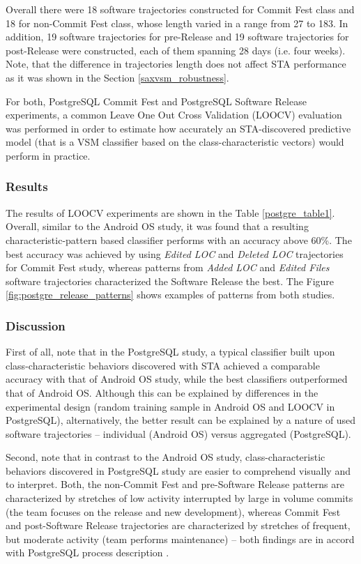 Overall there were 18 software trajectories constructed for Commit Fest class and 18 for non-Commit Fest class, whose length varied in a range from 27 to 183. In addition, 19 software trajectories for pre-Release and 19 software trajectories for post-Release were constructed, each of them spanning 28 days (i.e. four weeks). Note, that the difference in trajectories length does not affect STA performance as it was shown in the Section \ref{saxvsm_robustness}.

For both, PostgreSQL Commit Fest and PostgreSQL Software Release experiments, a common Leave One Out Cross Validation (LOOCV) \cite{citeulike:11275990} evaluation was performed in order to estimate how accurately an STA-discovered predictive model (that is a VSM classifier based on the class-characteristic vectors) would perform in practice.

\subsubsection{Results}
The results of LOOCV experiments are shown in the Table \ref{postgre_table1}. Overall, similar to the Android OS study, it was found that a resulting characteristic-pattern based classifier performs with an accuracy above 60\%. The best accuracy was achieved by using \textit{Edited LOC} and \textit{Deleted LOC} trajectories for Commit Fest study, whereas patterns from \textit{Added LOC} and \textit{Edited Files} software trajectories characterized the Software Release the best. The Figure \ref{fig:postgre_release_patterns} shows examples of patterns from both studies.

\subsubsection{Discussion}
First of all, note that in the PostgreSQL study, a typical classifier built upon class-characteristic behaviors discovered with STA achieved a comparable accuracy with that of Android OS study, while the best classifiers outperformed that of Android OS. Although  this can be explained by differences in the experimental design (random training sample in Android OS and LOOCV in PostgreSQL), alternatively, the better result can be explained by a nature of used software trajectories -- individual (Android OS) versus aggregated (PostgreSQL).

Second, note that in contrast to the Android OS study, class-characteristic behaviors discovered in PostgreSQL study are easier to comprehend visually and to interpret. Both, the non-Commit Fest and pre-Software Release patterns are characterized by stretches of low activity interrupted by large in volume commits (the team focuses on the release and new development), whereas Commit Fest and post-Software Release trajectories are characterized by stretches of frequent, but moderate activity (team performs maintenance) -- both findings are in accord with PostgreSQL process description \cite{commit-fest}.
\clearpage

